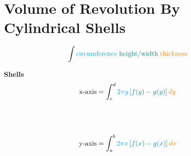 \section{Volume of Revolution By Cylindrical Shells}

\begin{equation*}
  \int \text{\textcolor{cyan}{circumference}} \;
       \text{\textcolor{teal}{height/width}} \;
       \text{\textcolor{orange}{thickness}}
\end{equation*}

\begin{framed}
  \noindent \textbf{Shells}
  \begin{align*}
    \text{x-axis} &= \int_c^d \textcolor{cyan}{2\pi y} \,
    \textcolor{teal}{[f(y)-g(y)]} \, \textcolor{orange}{dy}\\\\\\\\
    \text{y-axis} &= \int_a^b \textcolor{cyan}{2\pi x} \,
    \textcolor{teal}{[f(x)-g(x)]} \, \textcolor{orange}{dx}\\
  \end{align*}
\end{framed}